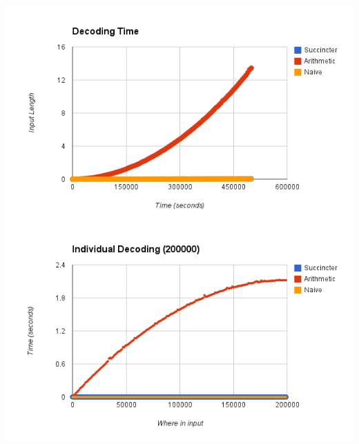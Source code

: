 \documentclass{article}
\begin{document}
\includegraphics[scale=0.4]{images/decoding_time}
\includegraphics[scale=0.4]{images/individual_decode_20000}
\afterpage{\vfill}
\end{document}
